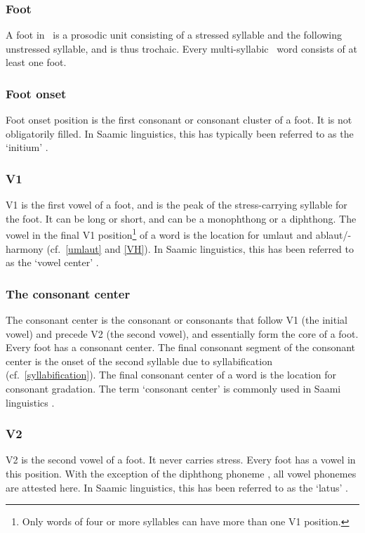 \subsubsection{Foot}\label{foot}
A {foot} in \PS\ is a prosodic unit consisting of a stressed syllable and the following unstressed syllable, and is thus trochaic. Every multi-syllabic \PS\ word consists of at least one foot. 

\subsubsection{Foot onset}\label{footOnset}
{Foot onset} position is the first consonant or consonant cluster of a foot. It is not obligatorily filled. 
In Saamic linguistics, this has typically been referred to as the ‘initium’ \citep[cf.][39]{Sammallahti1998}.

\subsubsection{V1}\label{v1}
{V1} is the first vowel of a foot, and is the peak of the stress-carrying syllable for the foot. It can be long or short, and can be a monophthong or a diphthong. The vowel in the final V1 position\footnote{Only words of four or more syllables can have more than one V1 position.}
 of a word is the location for umlaut and ablaut/-harmony (cf.~\SEC\ref{umlaut} and \SEC\ref{VH}). 
In Saamic linguistics, this has been referred to as the ‘vowel center’ \citep[cf.][39]{Sammallahti1998}.

\subsubsection{The consonant center}\label{CCent}
The {consonant center} is the consonant or consonants that follow V1 (the initial vowel) and precede V2 (the second vowel), and essentially form the core 
of a foot. Every foot has a consonant center. The final consonant segment of the consonant center is the onset of the second syllable due to syllabification (cf.~\SEC\ref{syllabification}). The final consonant center of a word is the location for consonant gradation. The term ‘consonant center’ is commonly used in Saami linguistics \citep[cf.][39]{Sammallahti1998}. 

\subsubsection{V2}\label{v2}
{V2} is the second vowel of a foot. It never carries stress. Every foot has a vowel in this position. With the exception of the diphthong phoneme , all vowel phonemes are attested here. 
In Saamic linguistics, this has been referred to as the ‘latus’ \citep[cf.][39]{Sammallahti1998}.

